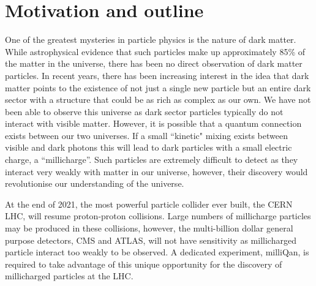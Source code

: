 \documentclass[11pt]{article}
\theoremstyle{plain} \numberwithin{equation}{section}
\theoremstyle{definition}
\begin{document}
\section*{Motivation and outline}
\noindent 

%

One of the greatest mysteries in particle physics is the nature of dark matter.
While astrophysical evidence that such particles make up approximately 85\% of the matter
in the universe, there has been no direct observation of dark matter particles. In recent years, 
there has been increasing interest in the idea that dark matter points to the 
existence of not just a single new particle but an entire dark sector 
with a structure that could be as rich as complex as our own. We have not been able to
observe this universe as dark sector particles typically do not interact with
visible matter. However, it is possible that a quantum connection exists between our two universes. 
If a small ``kinetic" mixing exists between visible and dark photons this
will lead to dark particles with a small electric charge, a ``millicharge''.
Such particles are extremely difficult to detect as they interact very weakly with
matter in our universe, however, their discovery would revolutionise our understanding
of the universe.

At the end of 2021, the most powerful particle collider ever built, the CERN LHC, 
will resume proton-proton collisions. Large numbers of millicharge particles may be 
produced in these collisions, however, the multi-billion dollar general purpose
detectors, CMS and ATLAS, will not have sensitivity as millicharged particle interact
too weakly to be observed. A dedicated experiment, milliQan, is required to take advantage of 
this unique opportunity for the discovery of millicharged particles at the LHC.
\end{document}
